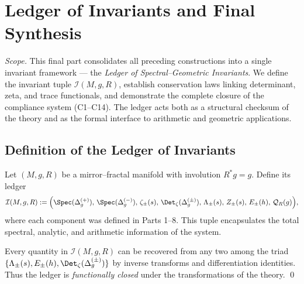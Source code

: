 \section{Ledger of Invariants and Final Synthesis}
\label{sec:ch6-part9-ledger} \relax \hspace{0pt}
\FlowBreaker
\noindent\emph{Scope.}  
This final part consolidates all preceding constructions into a single invariant framework — the \emph{Ledger of Spectral–Geometric Invariants}.  
We define the invariant tuple $\mathcal{I}(M,g,R)$, establish conservation laws linking determinant, zeta, and trace functionals, and demonstrate the complete closure of the compliance system (C1–C14).  
The ledger acts both as a structural checksum of the theory and as the formal interface to arithmetic and geometric applications.  


\subsection{Definition of the Ledger of Invariants}
\label{subsec:ch6-part9-def} \relax \hspace{0pt}
\begin{definition}
\label{def:ledger}
Let $(M,g,R)$ be a mirror–fractal manifold with involution $R^*g=g$.  
Define its ledger
\[
\mathcal{I}(M,g,R)
:= \Big(
\Spec(\Delta_g^{(+)}),\,
\Spec(\Delta_g^{(-)}),\,
\zeta_\pm(s),\,
\Det_\zeta(\Delta_g^{(\pm)}),\,
\Lambda_\pm(s),\,
Z_\pm(s),\,
E_\pm(h),\,
\mathcal{Q}_R(g)
\Big),
\]
where each component was defined in Parts 1–8.  
This tuple encapsulates the total spectral, analytic, and arithmetic information of the system.  
\end{definition}

\begin{remark}
\label{rem:ledger-complete}
Every quantity in $\mathcal{I}(M,g,R)$ can be recovered from any two among the triad $\{\Lambda_\pm(s), E_\pm(h), \Det_\zeta(\Delta_g^{(\pm)})\}$ by inverse transforms and differentiation identities.  
Thus the ledger is \emph{functionally closed} under the transformations of the theory.  
\qed {} %
\end{remark}


